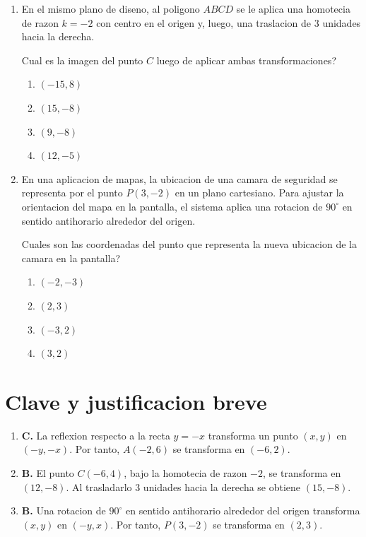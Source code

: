 \documentclass[12pt]{article}
\begin{document}
\begin{enumerate}[label=\textbf{\arabic*.}, itemsep=1.05cm]
\Needspace{0.52\textheight}
\item
En el mismo plano de diseno, al poligono $ABCD$ se le aplica una homotecia de razon $k=-2$ con centro en el origen y, luego, una traslacion de $3$ unidades hacia la derecha.

\textquestiondown Cual es la imagen del punto $C$ luego de aplicar ambas transformaciones?

\begin{enumerate}[label=\Alph*)]
  \item $(-15,8)$
  \item $(15,-8)$
  \item $(9,-8)$
  \item $(12,-5)$
\end{enumerate}

\Needspace{0.48\textheight}
\item
En una aplicacion de mapas, la ubicacion de una camara de seguridad se representa por el punto $P(3,-2)$ en un plano cartesiano. Para ajustar la orientacion del mapa en la pantalla, el sistema aplica una rotacion de $90^\circ$ en sentido antihorario alrededor del origen.

\textquestiondown Cuales son las coordenadas del punto que representa la nueva ubicacion de la camara en la pantalla?

\begin{enumerate}[label=\Alph*)]
  \item $(-2,-3)$
  \item $(2,3)$
  \item $(-3,2)$
  \item $(3,2)$
\end{enumerate}

\end{enumerate}

\section*{Clave y justificacion breve}

\begin{enumerate}[label=\textbf{\arabic*.}]
  \item \textbf{C.} La reflexion respecto a la recta $y=-x$ transforma un punto $(x,y)$ en $(-y,-x)$. Por tanto, $A(-2,6)$ se transforma en $(-6,2)$.
  \item \textbf{B.} El punto $C(-6,4)$, bajo la homotecia de razon $-2$, se transforma en $(12,-8)$. Al trasladarlo $3$ unidades hacia la derecha se obtiene $(15,-8)$.
  \item \textbf{B.} Una rotacion de $90^\circ$ en sentido antihorario alrededor del origen transforma $(x,y)$ en $(-y,x)$. Por tanto, $P(3,-2)$ se transforma en $(2,3)$.
\end{enumerate}
\end{document}
